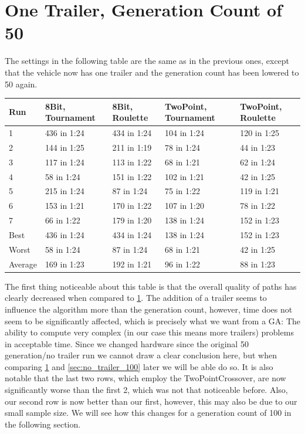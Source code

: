 \section{One Trailer, Generation Count of 50}
\label{sec:no_trailer_50}

The settings in the following table are the same as in the previous ones, except that the vehicle now has one trailer and the generation count has been lowered to 50 again.

\begin{center}
	\begin{tabular}{| l | l | l | p{3cm} | p{3cm}|}
		\hline
		Run 		& 8Bit, Tournament 	& 8Bit, Roulette 	& TwoPoint, Tournament 	& TwoPoint, Roulette	\\ \hline
		1				&	436 in 1:24				&	434 in 1:24			&	104 in 1:24						&	120 in 1:25					\\ \hline
		2				&	144 in 1:25				&	211 in 1:19			&	78 in 1:24						&	44 in 1:23					\\ \hline
		3				&	117 in 1:24				&	113 in 1:22			&	68 in 1:21						&	62 in 1:24					\\ \hline
		4				&	58 in 1:24				&	151 in 1:22			&	102 in 1:21						&	42 in 1:25					\\ \hline
		5				&	215 in 1:24				&	87 in 1:24			&	75 in 1:22						&	119 in 1:21					\\ \hline
		6				&	153 in 1:21				&	170 in 1:22			&	107 in 1:20						&	78 in 1:22					\\ \hline
		7				&	66 in 1:22				&	179 in 1:20			&	138 in 1:24						&	152 in 1:23					\\ \hline
		Best		&	436 in 1:24				&	434 in 1:24			&	138 in 1:24						&	152 in 1:23					\\ \hline
		Worst		&	58 in 1:24				&	87 in 1:24			&	68 in 1:21						& 42 in 1:25					\\ \hline
		Average	&	169 in 1:23				& 192 in 1:21			& 96 in 1:22						&	88 in 1:23					\\ \hline
		\hline
	\end{tabular}
\end{center}

The first thing noticeable about this table is that the overall quality of paths has clearly decreased when compared to \ref{sec:no_trailer_50}. The addition of a trailer seems to influence the algorithm more than the generation count, however, time does not seem to be significantly affected, which is precisely what we want from a GA: The ability to compute very complex (in our case this means more trailers) problems in acceptable time. Since we changed hardware since the original 50 generation/no trailer run we cannot draw a clear conclusion here, but when comparing \ref{sec:no_trailer_50} and \ref{sec:no_trailer_100} later we will be able do so. It is also notable that the last two rows, which employ the TwoPointCrossover, are now significantly worse than the first 2, which was not that noticeable before. Also, our second row is now better than our first, however, this may also be due to our small sample size. We will see how this changes for a generation count of 100 in the following section.

